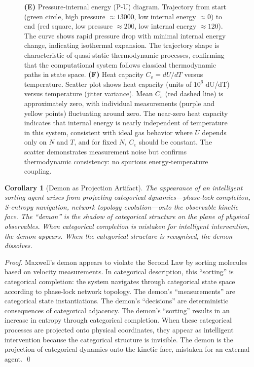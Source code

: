 \documentclass[12pt,a4paper]{article}
\newtheorem{corollary}[theorem]{Corollary}
\theoremstyle{definition}
\theoremstyle{remark}
\begin{document}
\begin{figure}[htbp]
{\textbf{(E)} Pressure-internal energy (P-U) diagram. Trajectory from start (green circle, high pressure $\approx 13000$, low internal energy $\approx 0$) to end (red square, low pressure $\approx 200$, low internal energy $\approx 120$). The curve shows rapid pressure drop with minimal internal energy change, indicating isothermal expansion. The trajectory shape is characteristic of quasi-static thermodynamic processes, confirming that the computational system follows classical thermodynamic paths in state space.
\textbf{(F)} Heat capacity $C_v = dU/dT$ versus temperature. Scatter plot shows heat capacity (units of $10^6$ dU/dT) versus temperature (jitter variance). Mean $C_v$ (red dashed line) is approximately zero, with individual measurements (purple and yellow points) fluctuating around zero. The near-zero heat capacity indicates that internal energy is nearly independent of temperature in this system, consistent with ideal gas behavior where $U$ depends only on $N$ and $T$, and for fixed $N$, $C_v$ should be constant. The scatter demonstrates measurement noise but confirms thermodynamic consistency: no spurious energy-temperature coupling.}
\label{fig:thermodynamics}
\end{figure}


\begin{corollary}[Demon as Projection Artifact]
\label{cor:demon_projection}
The appearance of an intelligent sorting agent arises from projecting categorical dynamics—phase-lock completion, S-entropy navigation, network topology evolution—onto the observable kinetic face. The ``demon'' is the shadow of categorical structure on the plane of physical observables. When categorical completion is mistaken for intelligent intervention, the demon appears. When the categorical structure is recognised, the demon dissolves.
\end{corollary}

\begin{proof}
Maxwell's demon appears to violate the Second Law by sorting molecules based on velocity measurements. In categorical description, this ``sorting'' is categorical completion: the system navigates through categorical state space according to phase-lock network topology. The demon's ``measurements'' are categorical state instantiations. The demon's ``decisions'' are deterministic consequences of categorical adjacency. The demon's ``sorting'' results in an increase in entropy through categorical completion. When these categorical processes are projected onto physical coordinates, they appear as intelligent intervention because the categorical structure is invisible. The demon is the projection of categorical dynamics onto the kinetic face, mistaken for an external agent. \qed
\end{proof}
\end{document}
